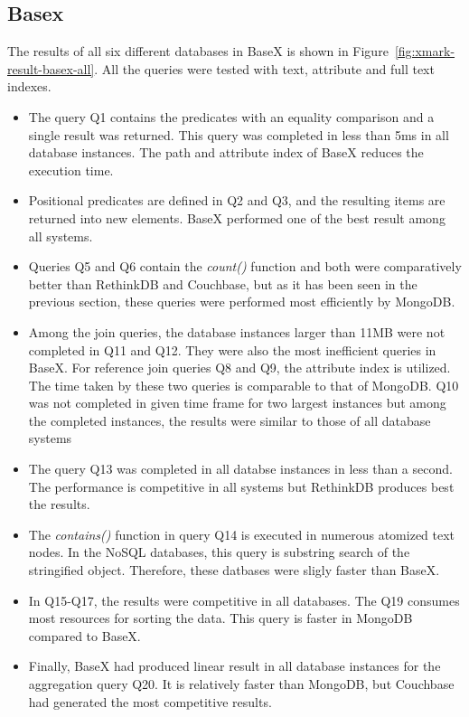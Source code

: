 \subsection{Basex}
The results of all six different databases in BaseX is shown in Figure~\ref{fig:xmark-result-basex-all}. All the queries were tested with text, attribute and full text indexes. 
\begin{itemize}
\item The query Q1 contains the predicates with an equality comparison and a single result was returned. This query was completed in less than 5ms in all database instances.  The path and attribute index of BaseX reduces the execution time.

\item Positional predicates are defined in Q2 and Q3, and the resulting items are returned into new elements. BaseX performed one of the best result among all systems. 

\item Queries Q5 and Q6 contain the \textit{count()} function and both were comparatively better than RethinkDB and Couchbase, but as it has been seen in the previous section, these queries were performed most efficiently by MongoDB.
\item 
Among the join queries, the database instances larger than 11MB were not completed in Q11 and Q12. They were also the most inefficient queries in BaseX.  For reference join queries Q8 and Q9, the attribute index is utilized. The time taken by these two queries is comparable to that of MongoDB. Q10 was not completed in given time frame for two largest instances but among the completed instances, the results were similar to those of all database systems 
\item The query Q13 was completed in all databse instances in less than a second. The performance is competitive in all systems but RethinkDB produces best the results. 
\item  The \textit{contains()} function in query Q14 is executed in numerous atomized text nodes. In the NoSQL databases, this query is  substring search of the stringified object. Therefore, these datbases were sligly faster than BaseX. 

\item In Q15-Q17, the results were competitive in all databases. The Q19 consumes most resources for sorting the data. This query is faster in MongoDB compared to BaseX.

\item Finally, BaseX  had produced linear result in all database instances for the aggregation query Q20. It is relatively faster than MongoDB, but Couchbase had generated the most competitive results. 
\end{itemize}
